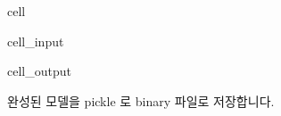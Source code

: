 \documentclass[letterpaper,10pt,english]{jupyterBook}
\begin{document}
\begin{sphinxuseclass}{cell}
\begin{sphinxVerbatimInput}
\begin{sphinxuseclass}{cell_input}
\end{sphinxuseclass}\end{sphinxVerbatimInput}
\begin{sphinxVerbatimOutput}

\begin{sphinxuseclass}{cell_output}
\noindent{}

\noindent{}

\noindent{}

\noindent{}

\end{sphinxuseclass}\end{sphinxVerbatimOutput}

\end{sphinxuseclass}
\sphinxAtStartPar
 완성된 모델을 pickle 로 binary 파일로 저장합니다.
\end{document}
